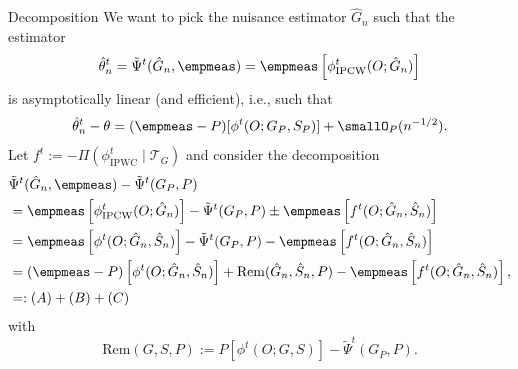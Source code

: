 \documentclass[smaller]{beamer}\usepackage{listings}
\begin{document}
\begin{frame}[label={sec:org1647261}]{Decomposition}
\small
We want to pick the nuisance estimator $\hat G_n$ such that the estimator
\begin{equation*}
  \hat{\theta}^t_n = \tilde{\Psi}^t(\hat G_n, \empmeas) =
  \empmeas
  \left[
    \phi^t_{\mathrm{IPCW}}(O; \hat{G}_n)
  \right]
\end{equation*}
is asymptotically linear (and efficient), i.e., such that
\begin{equation*}
  \hat{\theta}^t_n - \theta = (\empmeas-P)[\phi^t(O;G_P, S_P)] + \smallO_P(n^{-1/2}).
\end{equation*}
\pause Let $f^t:= -\Pi(\phi^t_{\mathrm{IPWC}} \mid \mathcal{T}_G)$ and consider
the decomposition
\begin{align*}
  & \tilde{\Psi}^t(\hat G_n, \empmeas) - \tilde{\Psi}^t(G_P, P)
  \\ & = \empmeas
       \left[
       \phi^t_{\mathrm{IPCW}}(O; \hat{G}_n)
       \right] - \tilde{\Psi}^t(G_P, P)
       \pm \empmeas
       \left[
       f^t(O; \hat{G}_n, \hat{S}_n)
       \right]
  \\ & = \empmeas
       \left[
       \phi^t(O; \hat{G}_n, \hat{S}_n)
       \right] - \tilde{\Psi}^t(G_P, P)
       - \empmeas
       \left[
       f^t(O; \hat{G}_n, \hat{S}_n)
       \right]
  \\ & = (\empmeas-P)
       \left[
       \phi^t(O; \hat{G}_n, \hat{S}_n)
       \right] 
       +\mathrm{Rem}(\hat{G}_n, \hat{S}_n, P)
       - \empmeas
       \left[
       f^t(O; \hat{G}_n, \hat{S}_n)
       \right],
       \\ & =: (A) + (B) + (C)
\end{align*}
with
\begin{equation*}
  \mathrm{Rem}(G, S, P) := P[\phi^t(O ; G, S)] - \tilde{\Psi}^t(G_P, P).
\end{equation*}
\end{frame}
\end{document}
